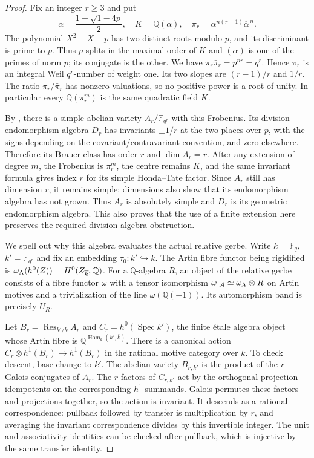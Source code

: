 \begin{proof}
Fix an integer $r\geq3$ and put
\[
 \alpha=\frac{1+\sqrt{1-4p}}2,\quad K=\mathbb Q(\alpha),\quad
 \pi_r=\alpha^{n(r-1)}\overline\alpha^{\,n}.
 \tag{D.7}
\]
The polynomial $X^2-X+p$ has two distinct roots modulo $p$, and its
discriminant is prime to $p$. Thus $p$ splits in the maximal order of
$K$ and $(\alpha)$ is one of the primes of norm $p$; its conjugate is
the other. We have $\pi_r\bar\pi_r=p^{nr}=q^r$. Hence $\pi_r$ is an
integral Weil $q^r$-number of weight one. Its two slopes are
$(r-1)/r$ and $1/r$. The ratio $\pi_r/\bar\pi_r$ has nonzero valuations,
so no positive power is a root of unity. In particular every
$\mathbb Q(\pi_r^m)$ is the same quadratic field $K$.

By \citet[Th\'eor\`eme 1(i)--(ii), p.~96]{Tate1971}, there is a simple
abelian variety $A_r/\mathbb F_{q^r}$ with this Frobenius. Its division
endomorphism algebra $D_r$ has invariants $\pm1/r$ at the two places over
$p$, with the signs depending on the covariant/contravariant convention,
and zero elsewhere. Therefore its Brauer class has order $r$ and
$\dim A_r=r$. After any extension of degree $m$, the Frobenius is
$\pi_r^m$, the centre remains $K$, and the same invariant formula gives
index $r$ for its simple Honda--Tate factor. Since $A_r$ still has dimension
$r$, it remains simple; dimensions also show that its endomorphism algebra
has not grown. Thus $A_r$ is absolutely simple and $D_r$ is its geometric
endomorphism algebra. This also proves that the use of a finite extension
here preserves the required division-algebra obstruction.

We spell out why this algebra evaluates the actual relative gerbe.
Write $k=\mathbb F_q$, $k'=\mathbb F_{q^r}$ and fix an embedding
$\tau_0:k'\hookrightarrow\overline k$. The Artin fibre functor being
rigidified is
$\omega_{\rm A}(h^0(Z))=H^0(Z_{\overline k},\mathbb Q)$.
For a $\mathbb Q$-algebra $R$, an object of the relative gerbe consists
of a fibre functor $\omega$ with a tensor isomorphism
$\omega|_{\mathcal A}\simeq\omega_{\rm A}\otimes R$ on Artin motives
and a trivialization of the line $\omega(\mathbb Q(-1))$.
Its automorphism band is precisely $U_R$.

Let $B_r=\operatorname{Res}_{k'/k}A_r$ and
$C_r=h^0(\operatorname{Spec}k')$, the finite \'etale algebra object
whose Artin fibre is $\mathbb Q^{\operatorname{Hom}_k(k',\overline k)}$.
There is a canonical action
$C_r\otimes h^1(B_r)\to h^1(B_r)$ in the rational motive category
over $k$. To check descent, base change to $k'$. The abelian variety
$B_{r,k'}$ is the product of the $r$ Galois conjugates of $A_r$.
The $r$ factors of $C_{r,k'}$ act by the orthogonal projection
idempotents on the corresponding $h^1$ summands. Galois permutes
these factors and projections together, so the action is invariant.
It descends as a rational correspondence: pullback followed by
transfer is multiplication by $r$, and averaging the invariant
correspondence divides by this invertible integer. The unit and
associativity identities can be checked after pullback, which is
injective by the same transfer identity.


\end{proof}
